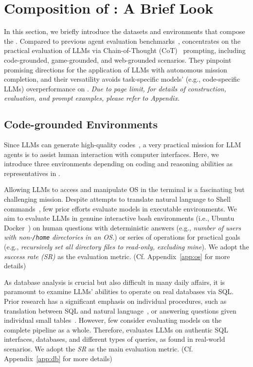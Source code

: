 \section{Composition of \model: A Brief Look}
In this section, we briefly introduce the datasets and environments that compose the \model.
Compared to previous agent evaluation benchmarks~\citep{cote2019textworld,fan2022minedojo}, \model concentrates on the practical evaluation of LLMs via Chain-of-Thought (CoT)~\citep{wei2022chain,yao2023react} prompting, including code-grounded, game-grounded, and web-grounded scenarios.
They pinpoint promising directions for the application of LLMs with autonomous mission completion, and their versatility avoids task-specific models' (e.g., code-specific LLMs) overperformance on \model.
\textit{Due to page limit, for details of construction, evaluation, and prompt examples, please refer to Appendix.}

\subsection{Code-grounded Environments}
Since LLMs can generate high-quality codes~\citep{chen2021evaluating}, a very practical mission for LLM agents is to assist human interaction with computer interfaces.
Here, we introduce three environments depending on coding and reasoning abilities as representatives in \model.

Allowing LLMs to access and manipulate OS in the terminal is a fascinating but challenging mission.
Despite attempts to translate natural language to Shell commands~\citep{lin2018nl2bash}, few prior efforts evaluate models in executable environments. 
We aim to evaluate LLMs in genuine interactive bash environments (i.e., Ubuntu Docker~\citep{merkel2014docker}) on human questions with deterministic answers (e.g., \textit{number of users with non-\texttt{/home} directories in an OS.}) or series of operations for practical goals (e.g., \textit{recursively set all directory files to read-only, excluding mine}).
We adopt the \textit{success rate (SR)} as the evaluation metric. (Cf. Appendix~\ref{app:os} for more details)

As database analysis is crucial but also difficult in many daily affairs, it is paramount to examine LLMs' abilities to operate on real databases via SQL. 
Prior research has a significant emphasis on individual procedures, such as translation between SQL and natural language~\citep{zhongSeq2SQL2017, gao2023text, pourreza2023din, ruan2023tptu}, or answering questions given individual small tables~\citep{nan2021fetaqa,iyyer-etal-2017-search-sqa}.
However, few consider evaluating models on the complete pipeline as a whole.
Therefore, \model evaluates LLMs on authentic SQL interfaces, databases, and different types of queries, as found in real-world scenarios.
We adopt the \textit{SR} as the main evaluation metric. (Cf. Appendix~\ref{app:db} for more details)

